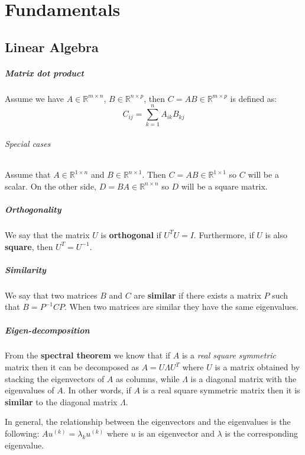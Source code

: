 \chapter{Fundamentals}

\section{Linear Algebra}

\paragraph{Matrix dot product}
Assume we have $A \in \mathbb{R}^{m \times n}$, $B \in \mathbb{R}^{n \times p}$, then $C = A B \in \mathbb{R}^{m \times p}$ is defined as:
\[
    C_{ij} = \sum_{k = 1}^{n} A_{ik} B_{kj}
\]

\subparagraph{Special cases}
Assume that $A \in \mathbb{R}^{1 \times n}$ and $B \in \mathbb{R}^{n \times 1}$. 
Then $C = A B \in \mathbb{R}^{1 \times 1}$ so $C$ will be a scalar. On the other side, $D = B A \in \mathbb{R}^{n \times n}$ so $D$ will be a square matrix.


\paragraph{Orthogonality}
We say that the matrix $U$ is \textbf{orthogonal} if $U^T U = I$.
Furthermore, if $U$ is also \textbf{square}, then $U^T = U^{-1}$.

\paragraph{Similarity}
We say that two matrices $B$ and $C$ are \textbf{similar} if there exists a matrix $P$ such that $B = P^{-1} C P$. When two matrices are similar they have the same eigenvalues.

\paragraph{Eigen-decomposition}
From the \textbf{spectral theorem} we know that if $A$ is a \textit{real square symmetric} matrix then it can be decomposed as $A = U \Lambda U^T$ where $U$ is a matrix obtained by stacking the eigenvectors of $A$ as columns, while $\Lambda$ is a diagonal matrix with the eigenvalues of $A$. In other words, if $A$ is a real square symmetric matrix then it is \textbf{similar} to the diagonal matrix $\Lambda$.

In general, the relationship between the eigenvectors and the eigenvalues is the following: $A u^{(k)} = \lambda_k u^{(k)}$ where $u$ is an eigenvector and $\lambda$ is the corresponding eigenvalue.

